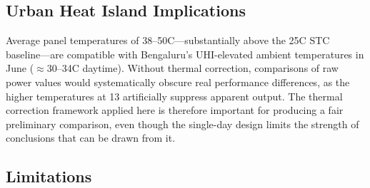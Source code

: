 \documentclass[conference]{IEEEtran}
\begin{document}
\subsection{Urban Heat Island Implications}

Average panel temperatures of 38--50\degree{}C---substantially above the 25\degree{}C STC
baseline---are compatible with Bengaluru's UHI-elevated ambient temperatures in June
($\approx$30--34\degree{}C daytime). Without thermal correction, comparisons of raw power
values would systematically obscure real performance differences, as the higher temperatures
at 13\degree{} artificially suppress apparent output. The thermal correction framework applied
here is therefore important for producing a fair preliminary comparison, even though the
single-day design limits the strength of conclusions that can be drawn from it.

\subsection{Limitations}
\label{sec:limitations}
\end{document}
